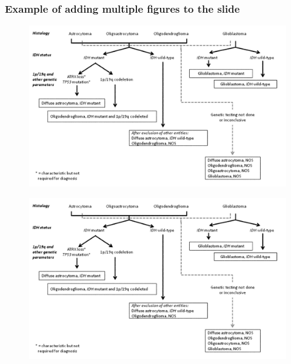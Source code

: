 \begin{frame}
    \frametitle{Example of adding multiple figures to the slide}
    \begin{figure}
        \begin{minipage}{0.65\textwidth}
            \centering
            \includegraphics[width=\linewidth,height=0.4\textheight,keepaspectratio]{Figures/gliomaHist.png}
            \label{fig1}
        \end{minipage}\hfill
         \begin{minipage}{0.35\textwidth}
            \centering
            \includegraphics[width=\linewidth,height=0.4\textheight,keepaspectratio]{Figures/gliomaHist.png}
            \label{fig2}
        \end{minipage}
    \end{figure}
\end{frame}

